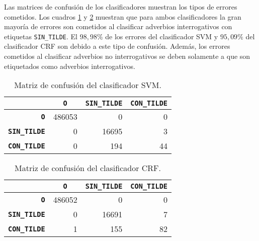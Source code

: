\documentclass[runningheads,a4paper]{llncs}
\begin{document}
Las matrices de confusi\'on de los clasificadores muestran los tipos de errores cometidos. Los cuadros \ref{table:confusion-svm} y \ref{table:confusion-crf} muestran que para ambos clasificadores la gran mayor\'ia de errores son cometidos al clasificar adverbios interrogativos con etiquetas \texttt{\small SIN\_TILDE}. El $98,98\%$ de los errores del clasificador SVM y $95,09\%$ del clasificador CRF son debido a este tipo de confusi\'on. Además, los errores cometidos al clasificar adverbios no interrogativos se deben solamente a que son etiquetados como adverbios interrogativos. %

\begin{table}[ht]
	\addtolength{\belowcaptionskip}{-2mm}
 	\renewcommand{\arraystretch}{1.3}
	\renewcommand{\tabcolsep}{3pt}
	\caption{Matriz de confusión del clasificador SVM.}
	\label{table:confusion-svm}
	\centering
	\begin{tabular}{|r||r|r|r|}
		\hline
			& \multicolumn{1}{c|}{\textbf{\texttt{~O~}}}
			& \multicolumn{1}{c|}{\textbf{\texttt{SIN\_TILDE}}}
			& \multicolumn{1}{c|}{\textbf{\texttt{CON\_TILDE}}} \\
		\hline\hline
		\textbf{\texttt{O}} & 486053 & 0 & 0 \\ \hline
		\textbf{\texttt{SIN\_TILDE}} & 0 & 16695 & 3 \\ \hline
		\textbf{\texttt{CON\_TILDE}} & 0 & 194 & 44 \\ 
		\hline
	\end{tabular}
\end{table}

\begin{table}[ht]
	\addtolength{\abovecaptionskip}{-6mm}
	\addtolength{\belowcaptionskip}{-2mm}
 	\renewcommand{\arraystretch}{1.3}
	\renewcommand{\tabcolsep}{3pt}
	\caption{Matriz de confusión del clasificador CRF.}
	\label{table:confusion-crf}
	\centering
	\begin{tabular}{|r||r|r|r|}
		\hline
			& \multicolumn{1}{c|}{\textbf{\texttt{~O~}}}
			& \multicolumn{1}{c|}{\textbf{\texttt{SIN\_TILDE}}}
			& \multicolumn{1}{c|}{\textbf{\texttt{CON\_TILDE}}} \\
		\hline\hline
		\textbf{\texttt{O}} & 486052 & 0 & 0 \\ \hline
		\textbf{\texttt{SIN\_TILDE}} & 0 & 16691 & 7 \\ \hline
		\textbf{\texttt{CON\_TILDE}} & 1 & 155 & 82 \\ 
		\hline
	\end{tabular}
\end{table}
\end{document}
